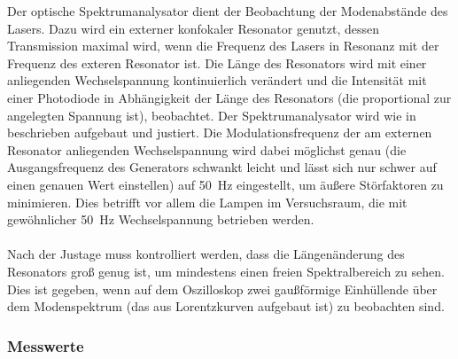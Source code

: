 \documentclass[11pt, a4paper]{article}
\numberwithin{equation}{section}
\begin{document}
Der optische Spektrumanalysator dient der Beobachtung der Modenabstände des Lasers.
Dazu wird ein externer konfokaler Resonator genutzt, dessen Transmission maximal wird, wenn die Frequenz des Lasers in Resonanz mit der Frequenz des exteren Resonator ist.
Die Länge des Resonators wird mit einer anliegenden Wechselspannung kontinuierlich verändert und die Intensität mit einer Photodiode in Abhängigkeit der Länge des Resonators (die proportional zur angelegten Spannung ist), beobachtet.
Der Spektrumanalysator wird wie in \cite{anleitung} beschrieben aufgebaut und justiert.
Die Modulationsfrequenz der am externen Resonator anliegenden Wechselspannung wird dabei möglichst genau (die Ausgangsfrequenz des Generators schwankt leicht und lässt sich nur schwer auf einen genauen Wert einstellen) auf \SI{50}{\hertz} eingestellt, um äußere Störfaktoren zu minimieren.
Dies betrifft vor allem die Lampen im Versuchsraum, die mit gewöhnlicher \SI{50}{\hertz} Wechselspannung betrieben werden.\\
\\
Nach der Justage muss kontrolliert werden, dass die Längenänderung des Resonators groß genug ist, um mindestens einen freien Spektralbereich zu sehen.
Dies ist gegeben, wenn auf dem Oszilloskop zwei gaußförmige Einhüllende über dem Modenspektrum (das aus Lorentzkurven aufgebaut ist) zu beobachten sind.

\subsubsection{Messwerte}
\end{document}
